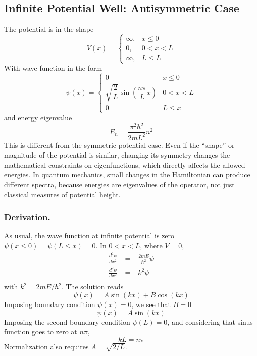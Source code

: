 \documentclass[../../../main.tex]{subfiles}
\begin{document}
\subsection{Infinite Potential Well: Antisymmetric Case}
The potential is in the shape
\begin{equation*}
    V(x)=
    \begin{cases}
        \infty, & x \leq0  \\
        0,      & 0<x<L    \\
        \infty, & L \leq L
    \end{cases}
\end{equation*}
With wave function in the form
\begin{equation*}
    \psi(x)=\begin{cases}
        0                                          & x\leq 0   \\
        \sqrt{\dfrac{2}{L}}\sin( \dfrac{n\pi}{L}x) & 0 < x < L \\
        0                                          & L \leq x
    \end{cases}
\end{equation*}
and energy eigenvalue
\begin{equation*}
    E_n=\frac{\pi^2\hbar^2}{2mL^2}n^2
\end{equation*}
This is different from the symmetric potential case.
Even if the “shape” or magnitude of the potential is similar, changing its symmetry changes the mathematical constraints on eigenfunctions, which directly affects the allowed energies.
In quantum mechanics, small changes in the Hamiltonian can produce different spectra, because energies are eigenvalues of the operator, not just classical measures of potential height.

\subsubsection{Derivation.}
As usual, the wave function at infinite potential is zero $\psi(x \leq 0)=\psi(L\leq x)=0$.
In $0 < x < L$, where $ V = 0$,
\begin{align*}
    \frac{d^2\psi}{dx^2} & = -\frac{2mE}{\hbar^2}\psi \\
    \frac{d^2\psi}{dx^2} & = -k^2\psi                 \\
\end{align*}
with $k^2 =2 m E/\hbar^2$.
The solution reads
\begin{equation*}
    \psi(x)=A\sin (kx)+ B \cos (kx)
\end{equation*}
Imposing boundary condition $\psi(x)=0$, we see that $B=0$
\begin{equation*}
    \psi(x)=A\sin (kx)
\end{equation*}
Imposing the second boundary condition $\psi(L)=0$, and considering that sinus function goes to zero at $n\pi$,
\begin{equation*}
    kL=n\pi
\end{equation*}
Normalization also requires $A = \sqrt{2/L}$.
\end{document}
